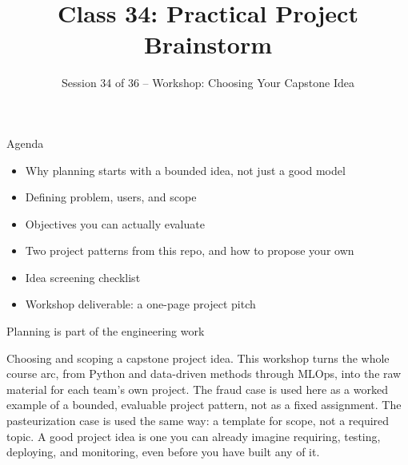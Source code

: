 

\title{Class 34: Practical Project Brainstorm}
\subtitle{Session 34 of 36 -- Workshop: Choosing Your Capstone Idea}
\author{\coursename}
\date{}



\frame{\titlepage \coursefooter}

\begin{frame}{Agenda}
\begin{itemize}
\item Why planning starts with a bounded idea, not just a good model
\item Defining problem, users, and scope
\item Objectives you can actually evaluate
\item Two project patterns from this repo, and how to propose your own
\item Idea screening checklist
\item Workshop deliverable: a one-page project pitch
\end{itemize}
\coursefooter
\end{frame}

\begin{frame}{Planning is part of the engineering work}
\coursefooter
\end{frame}

\coursecontextframe
{Choosing and scoping a capstone project idea.}
{This workshop turns the whole course arc, from Python and data-driven methods through MLOps, into the raw material for each team's own project.}
{The fraud case is used here as a worked example of a bounded, evaluable project pattern, not as a fixed assignment.}
{The pasteurization case is used the same way: a template for scope, not a required topic.}
{A good project idea is one you can already imagine requiring, testing, deploying, and monitoring, even before you have built any of it.}

